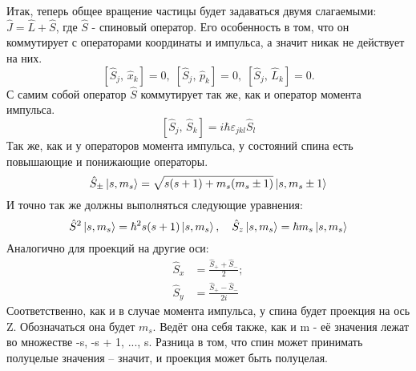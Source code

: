 Итак, теперь общее вращение частицы будет задаваться двумя слагаемыми: $\hat{J} = \hat{L} + \hat{S}$, где $\hat{S}$ - спиновый оператор. Его особенность в том, что он коммутирует с операторами координаты и импульса, а значит никак не действует на них.
\[
\left[\hat{S}_j, \, \hat{x}_k\right] = 0,\; \left[\hat{S}_j, \, \hat{p}_k\right] = 0,\; \left[\hat{S}_j, \, \hat{L}_k\right] = 0.
\]
С самим собой оператор $\hat{S}$ коммутирует так же, как и оператор момента импульса.
\[
\left[\hat{S}_j, \, \hat{S}_k\right] = i\hbar\varepsilon_{jkl}\hat{S}_l
\]
Так же, как и у операторов момента импульса, у состояний спина есть повышающие и понижающие операторы.
\[
\hat{S}_{\pm}\ket{s, m_s} = \sqrt{s(s+1) + m_s(m_s \pm 1)}\ket{s, m_s \pm 1}
\]
И точно так же должны выполняться следующие уравнения:
\[
\hat{S}^2\ket{s,m_s} = \hbar^2 s(s+ 1)\ket{s,m_s}, \quad \hat{S}_z\ket{s,m_s} = \hbar m_s\ket{s,m_s}
\]
Аналогично для проекций на другие оси:
\begin{align*}
    \hat{S}_x & = \frac{\hat{S}_+ + \hat{S}_-}{2};\\
    \hat{S}_y & = \frac{\hat{S}_+ - \hat{S}_-}{2i}
\end{align*}
Соответственно, как и в случае момента импульса, у спина будет проекция на ось Z. Обозначаться она будет $m_s$. Ведёт она себя также, как и m - её значения лежат во множестве {-s, -s + 1, ..., s}. Разница в том, что спин может принимать полуцелые значения -- значит, и проекция может быть полуцелая.

